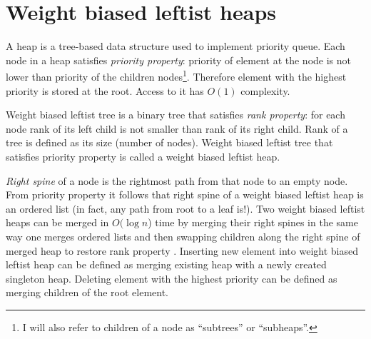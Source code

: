 \section{Weight biased leftist heaps}\label{sec:wblh}

A heap is a tree-based data structure used to implement priority queue. Each node in a heap satisfies \textit{priority property}: priority of element at the node is not lower than priority of the children nodes\footnote{I will also refer to children of a node as ``subtrees'' or ``subheaps''.}. Therefore element with the highest priority is stored at the root. Access to it has $O(1)$ complexity.

Weight biased leftist tree \cite{ChoSah96} is a binary tree that satisfies \textit{rank property}: for each node rank of its left child is not smaller than rank of its right child. Rank of a tree is defined as its size (number of nodes). Weight biased leftist tree that satisfies priority property is called a weight biased leftist heap.

\textit{Right spine} of a node is the rightmost path from that node to an empty node. From priority property it follows that right spine of a weight biased leftist heap is an ordered list (in fact, any path from root to a leaf is!). Two weight biased leftist heaps can be merged in $O(\log n$) time by merging their right spines in the same way one merges ordered lists and then swapping children along the right spine of merged heap to restore rank property \cite{Oka99}. Inserting new element into weight biased leftist heap can be defined as merging existing heap with a newly created singleton heap. Deleting element with the highest priority can be defined as merging children of the root element.